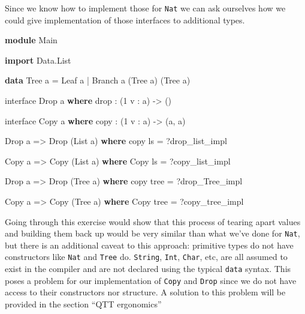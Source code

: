\documentclass[
]{article}
\newenvironment{Shaded}{}{}
\newcommand{\DataTypeTok}[1]{\textcolor[rgb]{0.56,0.13,0.00}{#1}}
\newcommand{\DecValTok}[1]{\textcolor[rgb]{0.25,0.63,0.44}{#1}}
\newcommand{\FunctionTok}[1]{\textcolor[rgb]{0.02,0.16,0.49}{#1}}
\newcommand{\KeywordTok}[1]{\textcolor[rgb]{0.00,0.44,0.13}{\textbf{#1}}}
\newcommand{\NormalTok}[1]{#1}
\newcommand{\OperatorTok}[1]{\textcolor[rgb]{0.40,0.40,0.40}{#1}}
\newcommand{\OtherTok}[1]{\textcolor[rgb]{0.00,0.44,0.13}{#1}}
\begin{document}
Since we know how to implement those for \texttt{Nat} we can ask
ourselves how we could give implementation of those interfaces to
additional types.

\begin{Shaded}
\begin{Highlighting}[]
\KeywordTok{module} \DataTypeTok{Main}

\KeywordTok{import} \DataTypeTok{Data.List}

\KeywordTok{data} \DataTypeTok{Tree}\NormalTok{ a }\OtherTok{=} \DataTypeTok{Leaf}\NormalTok{ a }\OperatorTok{|} \DataTypeTok{Branch}\NormalTok{ a (}\DataTypeTok{Tree}\NormalTok{ a) (}\DataTypeTok{Tree}\NormalTok{ a)}

\NormalTok{interface }\DataTypeTok{Drop}\NormalTok{ a }\KeywordTok{where}
    \FunctionTok{drop} \OperatorTok{:}\NormalTok{ (}\DecValTok{1}\NormalTok{ v }\OperatorTok{:}\NormalTok{ a) }\OtherTok{{-}\textgreater{}}\NormalTok{ ()}

\NormalTok{interface }\DataTypeTok{Copy}\NormalTok{ a }\KeywordTok{where}
\NormalTok{    copy }\OperatorTok{:}\NormalTok{ (}\DecValTok{1}\NormalTok{ v }\OperatorTok{:}\NormalTok{ a) }\OtherTok{{-}\textgreater{}}\NormalTok{ (a, a)}

\DataTypeTok{Drop}\NormalTok{ a }\OtherTok{=\textgreater{}} \DataTypeTok{Drop}\NormalTok{ (}\DataTypeTok{List}\NormalTok{ a) }\KeywordTok{where}
\NormalTok{    copy ls }\OtherTok{=} \OperatorTok{?}\NormalTok{drop\_list\_impl}

\DataTypeTok{Copy}\NormalTok{ a }\OtherTok{=\textgreater{}} \DataTypeTok{Copy}\NormalTok{ (}\DataTypeTok{List}\NormalTok{ a) }\KeywordTok{where}
    \DataTypeTok{Copy}\NormalTok{ ls }\OtherTok{=} \OperatorTok{?}\NormalTok{copy\_list\_impl}

\DataTypeTok{Drop}\NormalTok{ a }\OtherTok{=\textgreater{}} \DataTypeTok{Drop}\NormalTok{ (}\DataTypeTok{Tree}\NormalTok{ a) }\KeywordTok{where}
\NormalTok{    copy tree }\OtherTok{=} \OperatorTok{?}\NormalTok{drop\_Tree\_impl}

\DataTypeTok{Copy}\NormalTok{ a }\OtherTok{=\textgreater{}} \DataTypeTok{Copy}\NormalTok{ (}\DataTypeTok{Tree}\NormalTok{ a) }\KeywordTok{where}
    \DataTypeTok{Copy}\NormalTok{ tree }\OtherTok{=} \OperatorTok{?}\NormalTok{copy\_tree\_impl}
\end{Highlighting}
\end{Shaded}

Going through this exercise would show that this process of tearing
apart values and building them back up would be very similar than what
we've done for \texttt{Nat}, but there is an additional caveat to this
approach: primitive types do not have constructors like \texttt{Nat} and
\texttt{Tree} do. \texttt{String}, \texttt{Int}, \texttt{Char}, etc, are
all assumed to exist in the compiler and are not declared using the
typical \texttt{data} syntax. This poses a problem for our
implementation of \texttt{Copy} and \texttt{Drop} since we do not have
access to their constructors nor structure. A solution to this problem
will be provided in the section ``QTT ergonomics''
\end{document}
